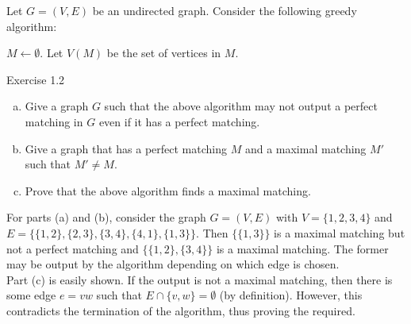 \begin{exercise}
	Let $G=(V,E)$ be an undirected graph. Consider the following greedy algorithm:
	\begin{algorithm*}
		\DontPrintSemicolon
		\SetNoFillComment
		$M\gets\emptyset$. Let $V(M)$ be the set of vertices in $M$.\;
		\caption{Exercise 1.2}\label{algo: ex 1.2}
	\end{algorithm*}

	\begin{enumerate}[(a)]
		\item Give a graph $G$ such that the above algorithm may not output a perfect matching in $G$ even if it has a perfect matching.
		\item Give a graph that has a perfect matching $M$ and a maximal matching $M'$ such that $M'\neq M$.
		\item Prove that the above algorithm finds a maximal matching.
	\end{enumerate}
\end{exercise}
\begin{solution*}
	For parts (a) and (b), consider the graph $G=(V,E)$ with $V=\{1,2,3,4\}$ and $E=\{\{1,2\},\{2,3\},\{3,4\},\{4,1\},\{1,3\}\}$. Then $\{\{1,3\}\}$ is a maximal matching but not a perfect matching and $\{\{1,2\},\{3,4\}\}$ is a maximal matching. The former may be output by the algorithm depending on which edge is chosen.\\
	Part (c) is easily shown. If the output is not a maximal matching, then there is some edge $e=vw$ such that $E\cap\{v,w\}=\emptyset$ (by definition). However, this contradicts the termination of the algorithm, thus proving the required.
\end{solution*}

